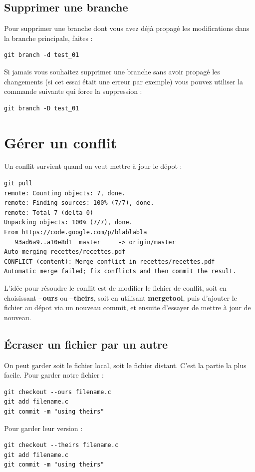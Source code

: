\documentclass[a4paper,twoside]{article}
\begin{document}
\subsection{Supprimer une branche}
Pour supprimer une branche dont vous avez déjà propagé les modifications dans la branche principale, faites : 
\begin{verbatim}
git branch -d test_01
\end{verbatim}

Si jamais vous souhaitez supprimer une branche sans avoir propagé les changements (si cet essai était une erreur par exemple) vous pouvez utiliser la commande suivante qui force la suppression : 
\begin{verbatim}
git branch -D test_01
\end{verbatim}

\section{Gérer un conflit}
Un conflit survient quand on veut mettre à jour le dépot : 
\begin{verbatim}
git pull
remote: Counting objects: 7, done.
remote: Finding sources: 100% (7/7), done.
remote: Total 7 (delta 0)
Unpacking objects: 100% (7/7), done.
From https://code.google.com/p/blablabla
   93ad6a9..a10e8d1  master     -> origin/master
Auto-merging recettes/recettes.pdf
CONFLICT (content): Merge conflict in recettes/recettes.pdf
Automatic merge failed; fix conflicts and then commit the result.
\end{verbatim}

L'idée pour résoudre le conflit est de modifier le fichier de conflit, soit en choisissant \textbf{--ours} ou \textbf{--theirs}, soit en utilisant \textbf{mergetool}, puis d'ajouter le fichier au dépot via un nouveau commit, et ensuite d'essayer de mettre à jour de nouveau.

\subsection{Écraser un fichier par un autre}
On peut garder soit le fichier local, soit le fichier distant. C'est la partie la plus facile. Pour garder notre fichier :
\begin{verbatim}
git checkout --ours filename.c
git add filename.c
git commit -m "using theirs"
\end{verbatim}

Pour garder leur version :
\begin{verbatim}
git checkout --theirs filename.c
git add filename.c
git commit -m "using theirs"
\end{verbatim}
\end{document}
